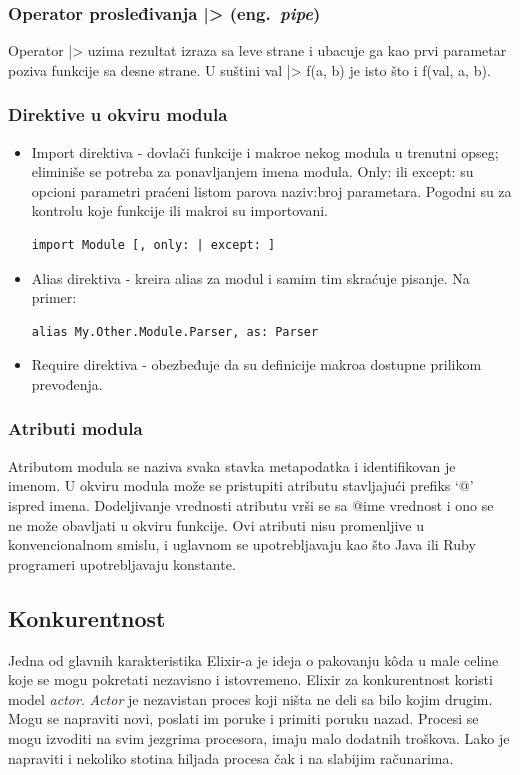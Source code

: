 \documentclass[a4paper]{article}
\begin{document}
\subsubsection{Operator prosleđivanja |> (eng.~{\em pipe})}
Operator |> uzima rezultat izraza sa leve strane i ubacuje ga kao prvi parametar poziva funkcije sa desne strane. U suštini val |> f(a, b) je isto što i f(val, a, b).

\subsubsection{Direktive u okviru modula}
\begin{itemize}
    \item Import direktiva - dovlači funkcije i makroe nekog modula u trenutni opseg; eliminiše se potreba za ponavljanjem imena modula. Only: ili except: su opcioni parametri  praćeni  listom parova naziv:broj parametara. Pogodni su za kontrolu koje funkcije ili makroi su importovani.
    \begin{lstlisting}[nolol=true]
    import Module [, only: | except: ]
    \end{lstlisting}
    \item Alias direktiva - kreira alias za modul i samim tim skraćuje pisanje.
    Na primer:
    \begin{lstlisting}[nolol=true]
    alias My.Other.Module.Parser, as: Parser
    \end{lstlisting}
    \item Require direktiva - obezbeđuje da su definicije makroa dostupne prilikom prevođenja.
\end{itemize}

\subsubsection{Atributi modula}
Atributom modula se naziva svaka stavka metapodatka i identifikovan je imenom. U okviru modula može se pristupiti atributu stavljajući prefiks ‘@’  ispred imena. Dodeljivanje vrednosti atributu vrši se sa @ime vrednost i ono se ne može obavljati u okviru funkcije. Ovi atributi nisu promenljive u konvencionalnom smislu, i uglavnom se upotrebljavaju kao što Java ili Ruby programeri upotrebljavaju konstante.

\subsection{Konkurentnost}
Jedna od glavnih karakteristika Elixir-a je ideja o pakovanju kôda u male celine koje se mogu pokretati nezavisno i istovremeno. Elixir za konkurentnost koristi model {\em actor}. {\em Actor} je nezavistan proces koji ništa ne deli sa bilo kojim drugim. Mogu se napraviti novi, poslati im poruke i primiti poruku nazad. Procesi se mogu izvoditi na svim jezgrima procesora, imaju malo dodatnih troškova. Lako je napraviti i nekoliko stotina hiljada procesa čak i na slabijim računarima. 
\end{document}
